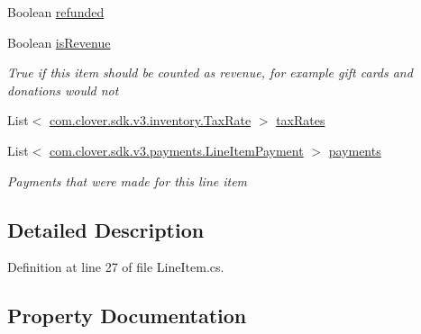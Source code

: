 \begin{DoxyCompactItemize}
\item 
Boolean \hyperlink{classcom_1_1clover_1_1sdk_1_1v3_1_1order_1_1_line_item_ae7792bf5ce3b06c0bccbfc69d96f8f5a}{refunded}
\item 
Boolean \hyperlink{classcom_1_1clover_1_1sdk_1_1v3_1_1order_1_1_line_item_a287202191b4ff40b5234589dd8071431}{is\+Revenue}
\begin{DoxyCompactList}\small\item\em True if this item should be counted as revenue, for example gift cards and donations would not \end{DoxyCompactList}\item 
List$<$ \hyperlink{classcom_1_1clover_1_1sdk_1_1v3_1_1inventory_1_1_tax_rate}{com.\+clover.\+sdk.\+v3.\+inventory.\+Tax\+Rate} $>$ \hyperlink{classcom_1_1clover_1_1sdk_1_1v3_1_1order_1_1_line_item_aac4d7e3fea611b0a54dff02492658ac4}{tax\+Rates}
\item 
List$<$ \hyperlink{classcom_1_1clover_1_1sdk_1_1v3_1_1payments_1_1_line_item_payment}{com.\+clover.\+sdk.\+v3.\+payments.\+Line\+Item\+Payment} $>$ \hyperlink{classcom_1_1clover_1_1sdk_1_1v3_1_1order_1_1_line_item_a4f6f64ae18b773281567764a88ba5ffa}{payments}
\begin{DoxyCompactList}\small\item\em Payments that were made for this line item \end{DoxyCompactList}\end{DoxyCompactItemize}


\subsection{Detailed Description}


Definition at line 27 of file Line\+Item.\+cs.



\subsection{Property Documentation}
\mbox{\label{classcom_1_1clover_1_1sdk_1_1v3_1_1order_1_1_line_item_ad92d1b639e56f340f573b3d8bd606bc2}} 
